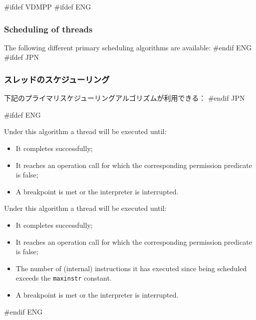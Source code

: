 \documentclass[\pformat,12pt]{article}
\begin{document}
#ifdef VDMPP
#ifdef ENG
\subsubsection{Scheduling of threads}\label{subsec:scheduling}

The following different primary scheduling algorithms are available:
#endif ENG
#ifdef JPN
\subsubsection{スレッドのスケジューリング}\label{subsec:scheduling}

下記のプライマリスケジューリングアルゴリズムが利用できる：
#endif JPN

\begin{description}

#ifdef ENG
\item[Pure Cooperative] Under this algorithm a thread will be executed
until:
\begin{itemize}
\item It completes successfully;
\item It reaches an operation call for which the corresponding
permission predicate is false;
\item A breakpoint is met or the interpreter is interrupted.
\end{itemize}
\item[Instruction number slicing] Under this algorithm a thread will
be executed until:
\begin{itemize}
\item It completes successfully;
\item It reaches an operation call for which the corresponding
permission predicate is false;
\item The number of (internal) instructions it has executed since
being scheduled exceeds the \texttt{maxinstr} constant.
\item A breakpoint is met or the interpreter is interrupted.
\end{itemize}
#endif ENG


\end{description}
\end{document}
